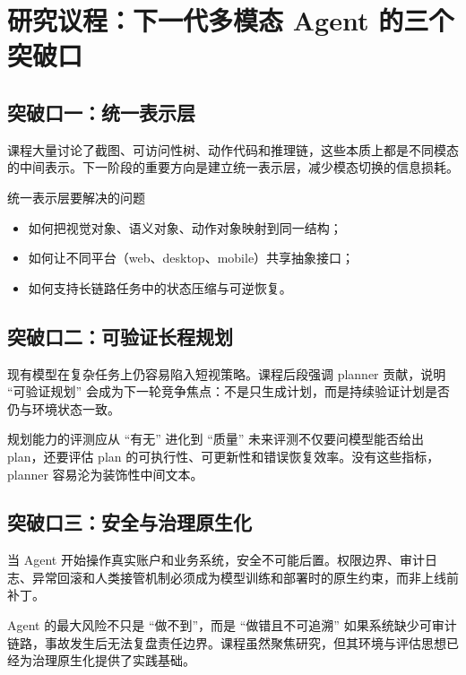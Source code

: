 \section{研究议程：下一代多模态 Agent 的三个突破口}

\subsection{突破口一：统一表示层}
课程大量讨论了截图、可访问性树、动作代码和推理链，这些本质上都是不同模态的中间表示。下一阶段的重要方向是建立统一表示层，减少模态切换的信息损耗。

\begin{knowledgebox}{统一表示层要解决的问题}
\begin{itemize}
    \item 如何把视觉对象、语义对象、动作对象映射到同一结构；
    \item 如何让不同平台（web、desktop、mobile）共享抽象接口；
    \item 如何支持长链路任务中的状态压缩与可逆恢复。
\end{itemize}
\end{knowledgebox}

\subsection{突破口二：可验证长程规划}
现有模型在复杂任务上仍容易陷入短视策略。课程后段强调 planner 贡献，说明 ``可验证规划'' 会成为下一轮竞争焦点：不是只生成计划，而是持续验证计划是否仍与环境状态一致。

\begin{importantbox}{规划能力的评测应从 ``有无'' 进化到 ``质量''}
未来评测不仅要问模型能否给出 plan，还要评估 plan 的可执行性、可更新性和错误恢复效率。没有这些指标，planner 容易沦为装饰性中间文本。
\end{importantbox}

\subsection{突破口三：安全与治理原生化}
当 Agent 开始操作真实账户和业务系统，安全不可能后置。权限边界、审计日志、异常回滚和人类接管机制必须成为模型训练和部署时的原生约束，而非上线前补丁。

\begin{warningbox}{Agent 的最大风险不只是 ``做不到''，而是 ``做错且不可追溯''}
如果系统缺少可审计链路，事故发生后无法复盘责任边界。课程虽然聚焦研究，但其环境与评估思想已经为治理原生化提供了实践基础。
\end{warningbox}

